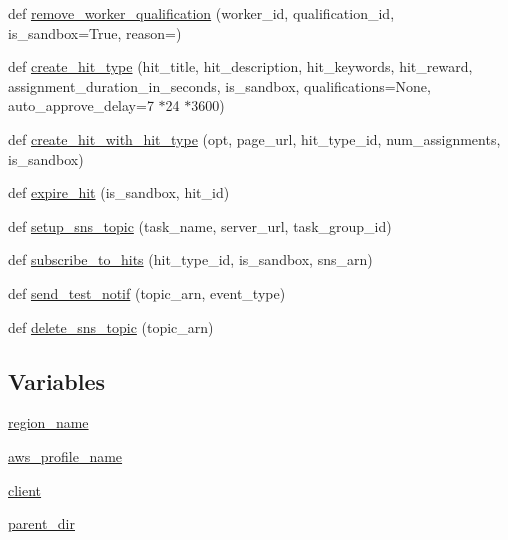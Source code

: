 \begin{DoxyCompactItemize}
\item 
def \hyperlink{namespaceparlai_1_1mturk_1_1core_1_1dev_1_1mturk__utils_abc2c057b91641179f7c4bb50dd916488}{remove\+\_\+worker\+\_\+qualification} (worker\+\_\+id, qualification\+\_\+id, is\+\_\+sandbox=True, reason=\textquotesingle{}\textquotesingle{})
\item 
def \hyperlink{namespaceparlai_1_1mturk_1_1core_1_1dev_1_1mturk__utils_acd08d4459a8231afa32daccd82c5c957}{create\+\_\+hit\+\_\+type} (hit\+\_\+title, hit\+\_\+description, hit\+\_\+keywords, hit\+\_\+reward, assignment\+\_\+duration\+\_\+in\+\_\+seconds, is\+\_\+sandbox, qualifications=None, auto\+\_\+approve\+\_\+delay=7 $\ast$24 $\ast$3600)
\item 
def \hyperlink{namespaceparlai_1_1mturk_1_1core_1_1dev_1_1mturk__utils_a471ced1f7df897dcf3414dd49b84ddeb}{create\+\_\+hit\+\_\+with\+\_\+hit\+\_\+type} (opt, page\+\_\+url, hit\+\_\+type\+\_\+id, num\+\_\+assignments, is\+\_\+sandbox)
\item 
def \hyperlink{namespaceparlai_1_1mturk_1_1core_1_1dev_1_1mturk__utils_a26e9e405bc015ef647ef58a133c88f40}{expire\+\_\+hit} (is\+\_\+sandbox, hit\+\_\+id)
\item 
def \hyperlink{namespaceparlai_1_1mturk_1_1core_1_1dev_1_1mturk__utils_a01315ef04ead23e4c1a84c027dcccf3f}{setup\+\_\+sns\+\_\+topic} (task\+\_\+name, server\+\_\+url, task\+\_\+group\+\_\+id)
\item 
def \hyperlink{namespaceparlai_1_1mturk_1_1core_1_1dev_1_1mturk__utils_a06d86a6c70c953fda4ae13db4d43bc79}{subscribe\+\_\+to\+\_\+hits} (hit\+\_\+type\+\_\+id, is\+\_\+sandbox, sns\+\_\+arn)
\item 
def \hyperlink{namespaceparlai_1_1mturk_1_1core_1_1dev_1_1mturk__utils_abfc17443a7c8018fc56dcc058e7b86f1}{send\+\_\+test\+\_\+notif} (topic\+\_\+arn, event\+\_\+type)
\item 
def \hyperlink{namespaceparlai_1_1mturk_1_1core_1_1dev_1_1mturk__utils_aa321f5dc5e9700bc3906fca85490e25e}{delete\+\_\+sns\+\_\+topic} (topic\+\_\+arn)
\end{DoxyCompactItemize}
\subsection*{Variables}
\begin{DoxyCompactItemize}
\item 
\hyperlink{namespaceparlai_1_1mturk_1_1core_1_1dev_1_1mturk__utils_a3dff8dba3aad1cc7f2e7cfbbc3984bc2}{region\+\_\+name}
\item 
\hyperlink{namespaceparlai_1_1mturk_1_1core_1_1dev_1_1mturk__utils_ab502738358dcb1b59d34a1443b21834e}{aws\+\_\+profile\+\_\+name}
\item 
\hyperlink{namespaceparlai_1_1mturk_1_1core_1_1dev_1_1mturk__utils_a09d7c0fc880089c5194ddc68af118f15}{client}
\item 
\hyperlink{namespaceparlai_1_1mturk_1_1core_1_1dev_1_1mturk__utils_a5813bb15ba851c7bbbf0871a7979720d}{parent\+\_\+dir}
\end{DoxyCompactItemize}


